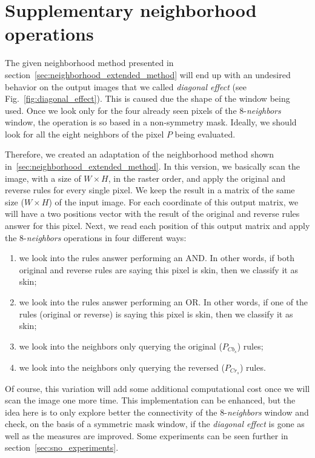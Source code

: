 \section{Supplementary neighborhood operations}
\label{sec:sup_neighborhood_operations}
The given neighborhood method presented in section~\ref{sec:neighborhood_extended_method} will end up with an undesired behavior on the output images that we called \textit{diagonal effect} (see Fig.~\ref{fig:diagonal_effect}). This is caused due the shape of the window being used. Once we look only for the four already seen pixels of the 8-\textit{neighbors} window, the operation is so based in a non-symmetry mask. Ideally, we should look for all the eight neighbors of the pixel $P$ being evaluated.

Therefore, we created an adaptation of the neighborhood method shown in~\ref{sec:neighborhood_extended_method}. In this version, we basically scan the image, with a size of $W \times H$, in the raster order, and apply the original and reverse rules for every single pixel. We keep the result in a matrix of the same size ($W \times H$) of the input image. For each coordinate of this output matrix, we will have a two positions vector with the result of the original and reverse rules answer for this pixel. Next, we read each position of this output matrix and apply the 8-\textit{neighbors} operations in four different ways:

\begin{enumerate}[label={(\arabic*)}]
    \item we look into the rules answer performing an AND. In other words, if both original and reverse rules are saying this pixel is skin, then we classify it as skin;
    \item we look into the rules answer performing an OR. In other words, if one of the rules (original or reverse) is saying this pixel is skin, then we classify it as skin;
    \item we look into the neighbors only querying the original ($P_{Cb_s}$) rules;
    \item we look into the neighbors only querying the reversed ($P_{Cr_s}$) rules.
\end{enumerate}

Of course, this variation will add some additional computational cost once we will scan the image one more time. This implementation can be enhanced, but the idea here is to only explore better the connectivity of the 8-\textit{neighbors} window and check, on the basis of a symmetric mask window, if the \textit{diagonal effect} is gone as well as the measures are improved. Some experiments can be seen further in section~\ref{sec:sno_experiments}.

